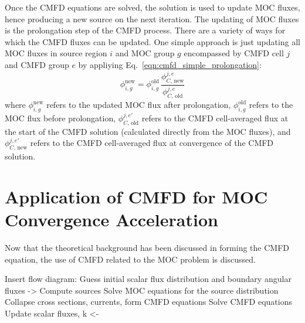Once the CMFD equations are solved, the solution is used to update MOC fluxes, hence producing a new source on the next iteration. The updating of MOC fluxes is the prolongation step of the CMFD process. There are a variety of ways for which the CMFD fluxes can be updated. One simple approach is just updating all MOC fluxes in source region $i$ and MOC group $g$ encompassed by CMFD cell $j$ and CMFD group $e$ by appliying Eq.~\ref{eqn:cmfd_simple_prolongation}:
\begin{equation}
\phi_{i,g}^{\text{new}} = \phi_{i,g}^{\text{old}} \, \frac{\phi_{C, \, \text{new}}^{j,e}}{\phi_{C, \, \text{old}}^{j,e}}
\label{eqn:cmfd_simple_prolongation}
\end{equation}
where $\phi_{i,g}^{\text{new}}$ refers to the updated MOC flux after prolongation, $\phi_{i,g}^{\text{old}}$ refers to the MOC flux before prolongation, $\phi_{C, \, \text{old}}^{j,e'}$ refers to the CMFD cell-averaged flux at the start of the CMFD solution (calculated directly from the MOC fluxes), and $\phi_{C, \, \text{new}}^{j,e'}$ refers to the CMFD cell-averaged flux at convergence of the CMFD solution.

\section{Application of CMFD for MOC Convergence Acceleration}
Now that the theoretical background has been discussed in forming the CMFD equation, the use of CMFD related to the MOC problem is discussed.


Insert flow diagram:
Guess initial scalar flux distribution and boundary angular fluxes
->
Compute sources
Solve MOC equations for the source distribution
Collapse cross sections, currents, form CMFD equations
Solve CMFD equations
Update scalar fluxes, k
<-